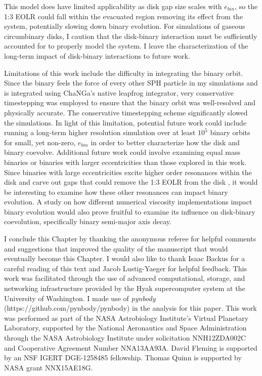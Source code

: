 This model does have limited applicability as disk gap size scales with $e_{bin}$, so the 1:3 EOLR could fall within the evacuated region removing its effect 
from the system, potentially slowing down binary evolution. For simulations of gaseous circumbinary disks, I caution that the disk-binary interaction must be 
sufficiently accounted for to properly model the system.  I leave the characterization of the long-term impact of disk-binary interactions to future work.

Limitations of this work include the difficulty in integrating the binary orbit.  Since the binary feels the force of every other SPH particle in my simulations and is 
integrated using ChaNGa's native leapfrog integrator, very conservative timestepping was employed to ensure that the binary orbit was well-resolved and 
physically accurate.  The conservative timestepping scheme significantly slowed the simulations.  In light of this limitation, potential future work could include 
running a long-term higher resolution simulation over at least $10^5$ binary orbits for small, yet non-zero, $e_{bin}$ in order to better 
characterize how the disk and binary coevolve.  Additional future work could involve examining equal mass binaries or binaries with larger eccentricities than 
those explored in this work.  Since binaries with large eccentricities excite higher order resonances within the disk \citep[e.g.][]{Artymowicz1992,Artymowicz2000} and carve out 
gaps that could remove the 1:3 EOLR from the disk \citep{Artymowicz1994}, it would be interesting to examine how these other resonances can impact binary evolution.  
A study on how different numerical viscosity implementations impact binary evolution would also prove fruitful to examine its influence on disk-binary 
coevolution, specifically binary semi-major axis decay.

I conclude this Chapter by thanking the anonymous referee for helpful comments and suggestions that improved the quality
of the manuscript that would eventually become this Chapter. I would also like to thank Isaac Backus for a careful reading of this text and
Jacob Lustig-Yaeger for helpful feedback. 
This work was facilitated through the use of advanced computational, storage, and networking
infrastructure provided by the Hyak supercomputer system at the
University of Washington.  I made use of {\em pynbody}
(https://github.com/pynbody/pynbody) in the analysis for this paper.
This work was performed as part of the NASA Astrobiology Institute's
Virtual Planetary Laboratory, supported by the National Aeronautics
and Space Administration through the NASA Astrobiology Institute under
solicitation NNH12ZDA002C and Cooperative Agreement Number
NNA13AA93A.  David Fleming is supported by an NSF IGERT DGE-1258485 fellowship.
Thomas Quinn is supported by NASA grant NNX15AE18G.